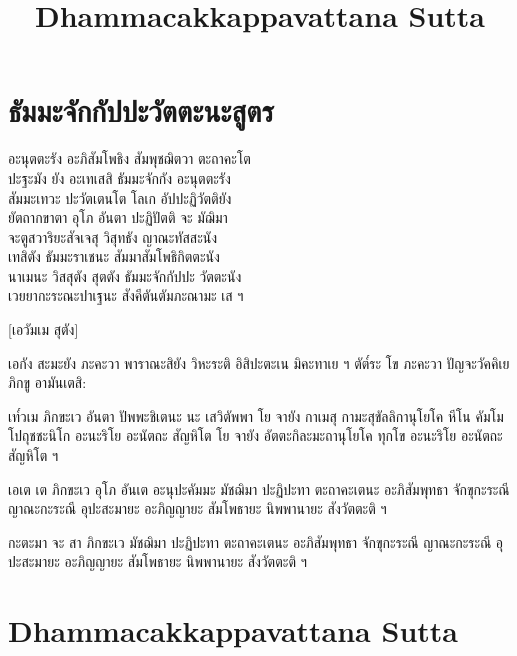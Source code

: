 \documentclass[
  babelLanguage=thai,
  final,
]{chantingbook}
\title{Dhammacakkappavattana Sutta}
\begin{document}
\mainmatter

\usePsMarksTitleOnly

\artopttrue

\renewcommand\chapterTitleFont{\thaiFont}

\chapter{ธัมมะจักกัปปะวัตตะนะสูตร}

\thaiText
\renewcommand{\thaiTitle}{}

\begin{leader}

อะนุตตะรัง อะภิสัมโพธิง สัมพุชฌิตวา ตะถาคะโต\\
ปะฐะมัง ยัง อะเทเสสิ ธัมมะจักกัง อะนุตตะรัง\\
สัมมะเทวะ ปะวัตเตนโต โลเก อัปปะฏิวัตติยัง\\
ยัตถากขาตา อุโภ อันตา ปะฏิปัตติ จะ มัฌิมา\\
จะตูสวาริยะสัจเจสุ วิสุทธัง ญาณะทัสสะนัง\\
เทสิตัง ธัมมะราเชนะ สัมมาสัมโพธิกิตตะนัง\\
นาเมนะ วิสสุตัง สุตตัง ธัมมะจักกัปปะ วัตตะนัง\\
เวยยากะระณะปาเฐนะ สังคีตันตัมภะณามะ เส ฯ

\end{leader}

[เอวัมเม สุตัง]

เอกัง สะมะยัง ภะคะวา พาราณะสิยัง วิหะระติ อิสิปะตะเน
มิคะทาเย ฯ ตัต๎ระ โข ภะคะวา ปัญจะวัคคิเย ภิกขู อามันเตสิ:

เท๎วเม ภิกขะเว อันตา ปัพพะชิเตนะ นะ เสวิตัพพา โย จายัง กาเมสุ
กามะสุขัลลิกานุโยโค หีโน คัมโม โปถุชชะนิโก อะนะริโย อะนัตถะ
สัญหิโต โย จายัง อัตตะกิละมะถานุโยโค ทุกโข อะนะริโย อะนัตถะสัญหิโต ฯ

เอเต เต ภิกขะเว อุโภ อันเต อะนุปะคัมมะ มัชฌิมา ปะฏิปะทา ตะถาคะเตนะ อะภิสัมพุทธา
จักขุกะระณี ญาณะกะระณี อุปะสะมายะ อะภิญญายะ สัมโพธายะ นิพพานายะ สังวัตตะติ ฯ

\enlargethispage{\baselineskip}

กะตะมา จะ สา ภิกขะเว มัชฌิมา ปะฏิปะทา ตะถาคะเตนะ อะภิสัมพุทธา จักขุกะระณี
ญาณะกะระณี อุปะสะมายะ อะภิญญายะ สัมโพธายะ นิพพานายะ สังวัตตะติ ฯ

\clearpage

\renewcommand\chapterTitleFont{\ubuntuXMedium}

\chapter{Dhammacakkappavattana Sutta}%
\end{document}

